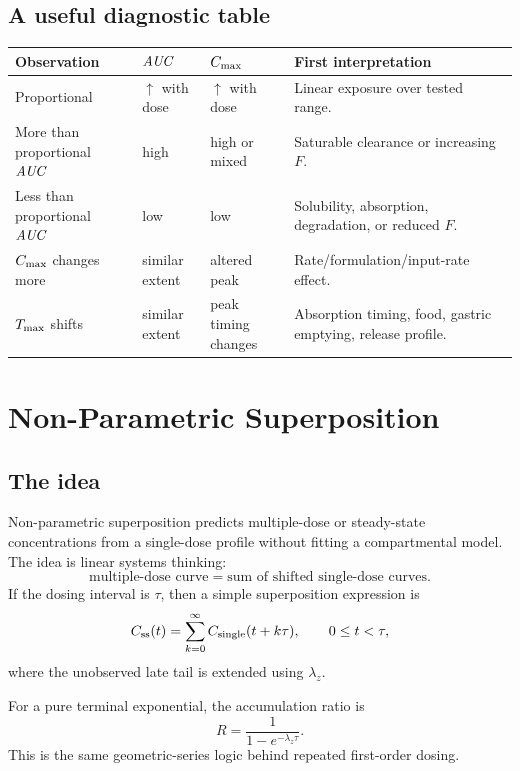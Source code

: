 \documentclass[a4paper]{article}
\newcommand{\AUC}{\ensuremath{\pksym{AUC}}}
\newcommand{\Cmax}{\ensuremath{C_{\pklab{max}}}}
\newcommand{\Tmax}{\ensuremath{T_{\pklab{max}}}}
\newcommand{\lambdaZ}{\ensuremath{\lambda_z}}
\begin{document}
\subsection{A useful diagnostic table}

\begin{center}
{\footnotesize
\begin{tabularx}{0.96\textwidth}{p{}p{}p{}X}
\toprule
Observation & \AUC{} & \Cmax{} & First interpretation\\
\midrule
Proportional & \(\uparrow\) with dose & \(\uparrow\) with dose & Linear exposure over tested range.\\
More than proportional \AUC{} & high & high or mixed & Saturable clearance or increasing \(F\).\\
Less than proportional \AUC{} & low & low & Solubility, absorption, degradation, or reduced \(F\).\\
\Cmax{} changes more & similar extent & altered peak & Rate/formulation/input-rate effect.\\
\Tmax{} shifts & similar extent & peak timing changes & Absorption timing, food, gastric emptying, release profile.\\
\bottomrule
\end{tabularx}
}
\end{center}

\section{Non-Parametric Superposition}

\subsection{The idea}

Non-parametric superposition predicts multiple-dose or steady-state concentrations from a single-dose profile without fitting a compartmental model. The idea is linear systems thinking:
\[
  \text{multiple-dose curve}
  =
  \text{sum of shifted single-dose curves}.
\]
If the dosing interval is \(\tau\), then a simple superposition expression is
\[
  C_{\mathrm{ss}}(t)
  =
  \sum_{k=0}^{\infty} C_{\mathrm{single}}(t+k\tau),
  \qquad
  0\leq t<\tau,
\]
where the unobserved late tail is extended using \(\lambdaZ\).

For a pure terminal exponential, the accumulation ratio is
\[
  R=\frac{1}{1-e^{-\lambdaZ\tau}}.
\]
This is the same geometric-series logic behind repeated first-order dosing.
\end{document}
